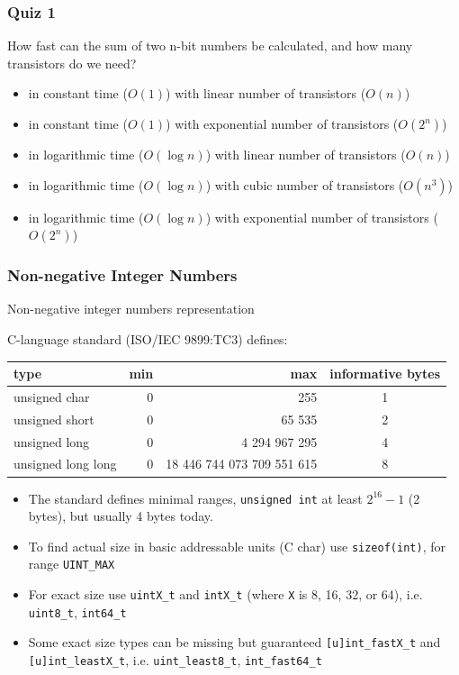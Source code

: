 \documentclass{beamer}
\begin{document}
\begin{frame}
\frametitle{Quiz 1}
How fast can the sum of two n-bit numbers be calculated, and how many transistors do we need?
\begin{itemize}
\item[A] in constant time ($O(1)$) with linear number of transistors ($O(n)$)
\item[B] in constant time ($O(1)$) with exponential number of transistors ($O(2^n)$)
\item[C] in logarithmic time ($O(\log{n})$) with linear number of transistors ($O(n)$)
\item[D] in logarithmic time ($O(\log{n})$) with cubic number of transistors ($O(n^3)$)
\item[E] in logarithmic time ($O(\log{n})$) with exponential number of transistors ($O(2^n)$)
\end{itemize}
\end{frame}


\begin{frame}
\frametitle{Non-negative Integer Numbers}
Non-negative integer numbers representation

C-language standard (ISO/IEC 9899:TC3) defines:
\begin{tabular}{|l|r|r|c|}\hline
type & min & max & informative bytes\\ \hline
unsigned char & 0 & 255 & 1 \\ \hline
unsigned short & 0 & 65 535 & 2 \\ \hline
unsigned long & 0 & 4 294 967 295 & 4 \\ \hline
unsigned long long & 0 & 18 446 744 073 709 551 615 & 8 \\ \hline
\end{tabular}

\begin{itemize}
\item The standard defines minimal ranges, \texttt{unsigned int} at least $2^{16}-1$ (2 bytes), but usually 4 bytes today.
\item To find actual size in basic addressable units (C char) use \texttt{sizeof(int)}, for range \texttt{UINT\_MAX}
\item For exact size use \texttt{uintX\_t} and \texttt{intX\_t} (where \texttt{X} is 8, 16, 32, or 64), i.e. \texttt{uint8\_t}, \texttt{int64\_t}
\item Some exact size types can be missing but guaranteed \texttt{[u]int\_fastX\_t} and \texttt{[u]int\_leastX\_t}, i.e. \texttt{uint\_least8\_t}, \texttt{int\_fast64\_t}
\end{itemize}

\end{frame}
\end{document}

